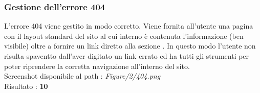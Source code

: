 \subsubsection{Gestione dell'errore 404}
L'errore 404 viene gestito in modo corretto.
Viene fornita all'utente una pagina con il layout standard del sito al cui
interno è contenuta l'informazione  (ben visibile) 
oltre a fornire un link diretto alla sezione 
. In questo modo l'utente non risulta
spaventto dall'aver digitato un link errato ed ha tutti gli strumenti per poter
riprendere la corretta navigazione all'interno del sito. \\ 
Screenshot disponibile al path : \textit{Figure/2/404.png} \\ 
Risultato : \textbf{10}